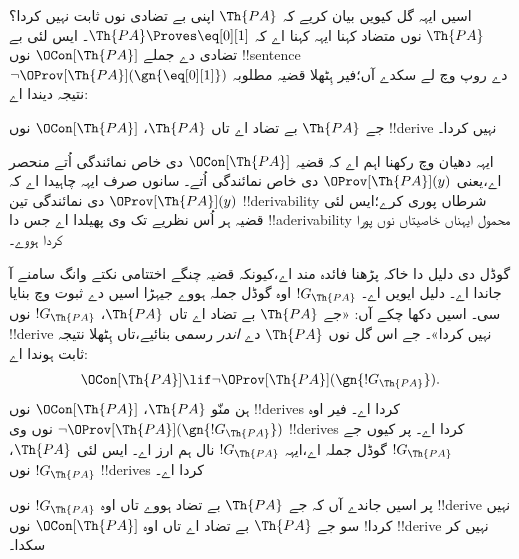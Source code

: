 \documentclass[../../../include/open-logic-section]{subfiles}
\begin{document}


اسیں ایہہ گل کیویں بیان کریے کہ $\Th{PA}$ اپنی بے تضادی نوں
ثابت نہیں کردا؟ $\Th{PA}$ نوں متضاد کہنا ایہہ کہنا اے کہ
$\Th{PA} \Proves \eq[0][1]$۔ ایس لئی بے تضادی دے جملے
$\OCon[\Th{PA}]$ نوں !!{sentence} $\lnot
\OProv[\Th{PA}](\gn{\eq[0][1]})$ دے روپ وچ لے سکدے آں؛فیر
ہِٹھلا قضیہ مطلوبہ نتیجہ دیندا اے:

\begin{thm}
جے $\Th{PA}$ بے تضاد اے تاں $\Th{PA}$، $\OCon[\Th{PA}]$
نوں !!{derive} نہیں کردا۔
\end{thm}

ایہہ دھیان وچ رکھنا اہم اے کہ قضیہ $\OCon[\Th{PA}]$ دی خاص
نمائندگی اُتے منحصر اے،یعنی $\OProv[\Th{PA}](y)$ دی خاص
نمائندگی اُتے۔ سانوں صرف ایہہ چاہیدا اے کہ
$\OProv[\Th{PA}](y)$ دی نمائندگی تین !!{derivability} شرطاں
پوری کرے؛ایس لئی قضیہ ہر اُس نظریے تک وی پھیلدا اے جس دا
!!a{derivability} محمول ایہناں خاصیتاں نوں پورا کردا ہووے۔

گوڈل دی دلیل دا خاکہ پڑھنا فائدہ مند اے،کیونکہ قضیہ چنگے
اختتامی نکتے وانگ سامنے آ جاندا اے۔ دلیل ایویں اے۔
$!G_\Th{PA}$ اوہ گوڈل جملہ ہووے جیہڑا اسیں
 دے ثبوت وچ بنایا سی۔ اسیں
دکھا چکے آں: «جے $\Th{PA}$ بے تضاد اے تاں $\Th{PA}$،
$!G_\Th{PA}$ نوں !!{derive} نہیں کردا»۔ جے اس گل نوں
$\Th{PA}$ دے \emph{اندر} رسمی بنائیے،تاں ہِٹھلا نتیجہ ثابت
ہوندا اے:
\[
\OCon[\Th{PA}] \lif \lnot \OProv[\Th{PA}](\gn{!G_\Th{PA}}).
\]
ہن منّو $\Th{PA}$، $\OCon[\Th{PA}]$ نوں !!{derive}s کردا
اے۔ فیر اوہ $\lnot
\OProv[\Th{PA}](\gn{!G_\Th{PA}})$ نوں وی !!{derive}s کردا اے۔
پر کیوں جے $!G_\Th{PA}$ گوڈل جملہ اے،ایہہ
$!G_\Th{PA}$ نال ہم ارز اے۔ ایس لئی
$\Th{PA}$، $!G_\Th{PA}$ نوں !!{derive}s کردا اے۔

پر اسیں جاندے آں کہ جے $\Th{PA}$ بے تضاد ہووے تاں اوہ
$!G_\Th{PA}$ نوں !!{derive} نہیں کردا!{} سو جے $\Th{PA}$
بے تضاد اے تاں اوہ $\OCon[\Th{PA}]$ نوں !!{derive} نہیں
کر سکدا۔
\end{document}
